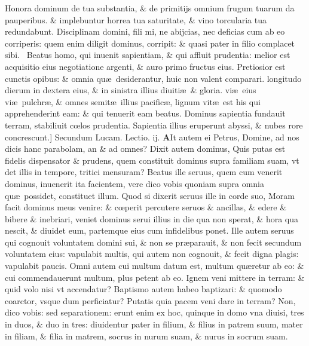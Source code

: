 \documentclass[a5paper,10pt]{book}
\def\leftmarginnote{%
	\lrmarginnote{\hskip -\marginparsep \hskip -6.5em}}
\def\ae{æ}
\def\oe{œ}
\begin{document}
\begin{multicols*}{2}
Honora dominum de tua substantia, \& de primitijs omnium frugum tuarum da pauperibus. \& implebuntur horrea tua saturitate, \& vino torcularia tua redundabunt.
Disciplinam domini, fili mi, ne abijcias, nec deficias cum ab eo corriperis: quem enim diligit dominus, corripit: \& quasi pater in filio complacet sibi. \textdagger \ 
Beatus\leftmarginnote{\begin{flushright}B\end{flushright}} homo, qui inuenit sapientiam, \& qui affluit prudentia: melior est acquisitio eius negotiatione argenti, \& auro primo fructus eius.
Pretiosior est cunctis opibus: \& omnia qu\ae \ desiderantur, huic non valent comparari.
longitudo dierum in dextera eius, \& in sinistra illius diuiti\ae \ \& gloria.
vi\ae \ eius vi\ae \ pulchr\ae , \& omnes
semit\ae \ illius pacific\ae , lignum vit\ae \ est his qui apprehenderint eam: \& qui tenuerit eam beatus.
Dominus sapientia fundauit terram, stabiliuit c\oe los prudentia.
Sapientia illius eruperunt abyssi, \& nubes rore concrescunt.]
\fancyhead[C]{\color{red} Feria. iiij. Dominic\ae . j. post aduentum}
\newline \color{red} Secundum Lucam. \hfill Lectio. ij. \color{black}
\vspace{-.25em}
\lettrine[lines=2]{\bfseries \color{red} A}{}It\leftmarginnote{\begin{flushright}c. 12.\end{flushright}} autem ei Petrus, Domine, ad nos dicis hanc parabolam, an \& ad omnes?
Dixit autem dominus, Quis putas est fidelis dispensator \& prudens, quem constituit dominus supra familiam suam, vt det illis in tempore, tritici mensuram?
Beatus ille seruus, quem cum venerit dominus, inuenerit ita facientem, vere dico vobis quoniam supra omnia qu\ae \ possidet, constituet illum.
Quod si dixerit seruus ille in corde suo, Moram facit dominus meus venire: \& c\oe perit percutere seruos \& ancillas, \& edere \& bibere \& inebriari, veniet dominus serui illius in die qua non sperat, \& hora qua nescit, \& diuidet eum, partemque eius cum infidelibus ponet.
Ille autem seruus qui cognouit voluntatem domini sui, \& non se pr\ae parauit, \& non fecit secundum voluntatem eius: vapulabit multis, qui autem non cognouit, \& fecit digna plagis: vapulabit paucis.
Omni autem cui multum datum est, multum qu\ae retur ab eo: \& cui commendauerunt multum, plus petent ab eo.
Ignem veni mittere in terram: \& quid volo nisi vt accendatur?
Baptismo autem habeo baptizari: \& quomodo coarctor, vsque dum perficiatur?
Putatis quia pacem veni dare in terram? Non, dico vobis: sed separationem: erunt enim ex hoc, quinque in domo vna diuisi, tres in duos, \& duo in tres: diuidentur pater in filium, \& filius in patrem suum, mater in filiam, \& filia in matrem, socrus in nurum suam, \& nurus in socrum suam.

\end{multicols*}
\end{document}
